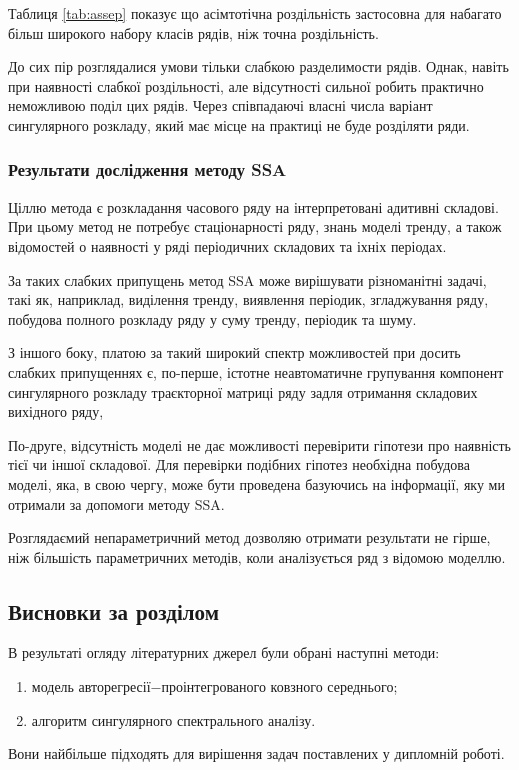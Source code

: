 Таблиця \ref{tab:assep} показує що асімтотічна роздільність застосовна для набагато більш широкого набору класів рядів, ніж точна роздільність.

До сих пір розглядалися умови тільки слабкою разделимости рядів. Однак, навіть при наявності слабкої роздільності, але відсутності сильної робить практично неможливою поділ цих рядів. Через співпадаючі власні числа варіант сингулярного розкладу, який має місце на практиці не буде розділяти ряди.


\subsubsection{Результати дослідження методу SSA}

Ціллю метода є розкладання часового ряду на інтерпретовані адитивні складові. При цьому метод не потребує стаціонарності ряду, знань моделі тренду, а також відомостей о наявності у ряді періодичних складових та іхніх періодах.

За таких слабких припущень метод SSA може вирішувати різноманітні задачі, такі як, наприклад, виділення тренду, виявлення періодик, згладжування ряду, побудова полного розкладу ряду у суму тренду, періодик та шуму.

З іншого боку, платою за такий широкий спектр можливостей при досить слабких припущеннях є, по-перше, істотне неавтоматичне групування компонент сингулярного розкладу траєкторної матриці ряду задля отримання складових вихідного ряду, 

По-друге, відсутність моделі не дає можливості перевірити гіпотези про наявність тієї чи іншої складової. Для перевірки подібних гіпотез необхідна побудова моделі, яка, в свою чергу, може бути проведена базуючись на інформації, яку ми отримали за допомоги методу SSA.

Розглядаємий непараметричний метод дозволяю отримати результати не гірше, ніж більшість параметричних методів, коли аналізується ряд з відомою моделлю.

\newpage

\subsection{Висновки за розділом}
В результаті огляду літературних джерел були обрані наступні методи:

\begin{enumerate}
	\item модель авторегресії$-$проінтегрованого ковзного середнього;
	\item алгоритм сингулярного спектрального аналізу.
\end{enumerate}

Вони найбільше підходять для вирішення задач поставлених у дипломній роботі.
